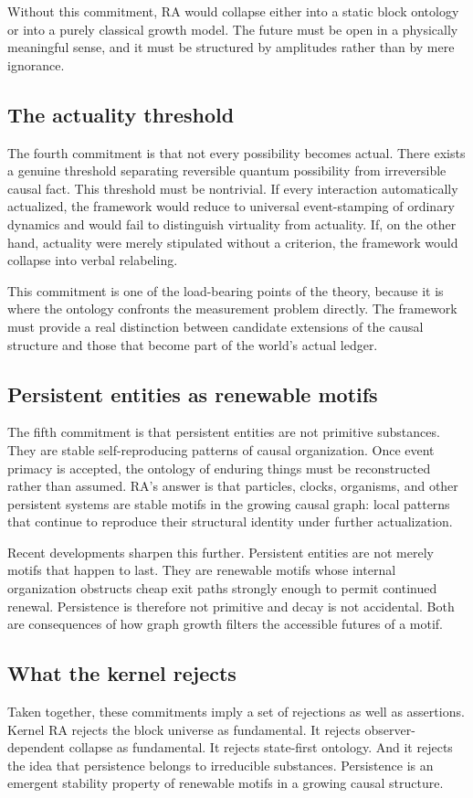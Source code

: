 \documentclass[11pt]{article}
\begin{document}
Without this commitment, RA would collapse either into a static block ontology or into a purely classical growth model. The future must be open in a physically meaningful sense, and it must be structured by amplitudes rather than by mere ignorance.

\subsection{The actuality threshold}
The fourth commitment is that not every possibility becomes actual. There exists a genuine threshold separating reversible quantum possibility from irreversible causal fact. This threshold must be nontrivial. If every interaction automatically actualized, the framework would reduce to universal event-stamping of ordinary dynamics and would fail to distinguish virtuality from actuality. If, on the other hand, actuality were merely stipulated without a criterion, the framework would collapse into verbal relabeling.

This commitment is one of the load-bearing points of the theory, because it is where the ontology confronts the measurement problem directly. The framework must provide a real distinction between candidate extensions of the causal structure and those that become part of the world's actual ledger.

\subsection{Persistent entities as renewable motifs}
The fifth commitment is that persistent entities are not primitive substances. They are stable self-reproducing patterns of causal organization. Once event primacy is accepted, the ontology of enduring things must be reconstructed rather than assumed. RA's answer is that particles, clocks, organisms, and other persistent systems are stable motifs in the growing causal graph: local patterns that continue to reproduce their structural identity under further actualization.

Recent developments sharpen this further. Persistent entities are not merely motifs that happen to last. They are renewable motifs whose internal organization obstructs cheap exit paths strongly enough to permit continued renewal. Persistence is therefore not primitive and decay is not accidental. Both are consequences of how graph growth filters the accessible futures of a motif.

\subsection{What the kernel rejects}
Taken together, these commitments imply a set of rejections as well as assertions. Kernel RA rejects the block universe as fundamental. It rejects observer-dependent collapse as fundamental. It rejects state-first ontology. And it rejects the idea that persistence belongs to irreducible substances. Persistence is an emergent stability property of renewable motifs in a growing causal structure.
\end{document}
